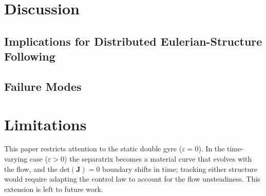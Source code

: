 \documentclass[lettersize,journal]{IEEEtran}
\begin{document}


\section{Discussion}
\label{sec:discussion}

\subsection{Implications for Distributed Eulerian-Structure Following}


\subsection{Failure Modes}



\section{Limitations}
\label{sec:limitations}

This paper restricts attention to the static double gyre ($\varepsilon = 0$).
In the time-varying case ($\varepsilon > 0$) the separatrix becomes a
material curve that evolves with the flow, and the det$(\mathbf{J}) = 0$
boundary shifts in time; tracking either structure would require adapting
the control law to account for the flow unsteadiness. This extension is
left to future work.
\end{document}
